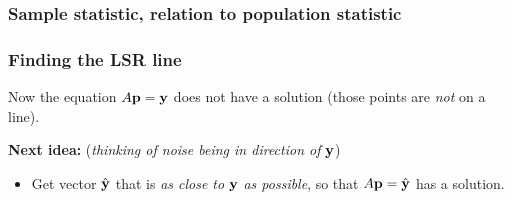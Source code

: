 \documentclass{beamer}
\theoremstyle{example}
\begin{document}
\begin{frame}[fragile]
\frametitle{Sample statistic, relation to population statistic}

\end{frame}
    
\begin{frame}
\frametitle{Finding the LSR line}
Now the equation $A{\bf p} = {\bf y}$ does not have a solution (those points are \emph{not} on a line). 

\textbf{Next idea:} (\emph{thinking of noise being in direction of} ${\bf y}$) 
\begin{itemize}
    \item Get vector $\hat{\bf y}$ that is \emph{as close to} ${\bf y}$ \emph{as possible}, so that $A{\bf p} = \hat{\bf y}$ has a solution.
\end{itemize}

\begin{multicols}{2}

\end{multicols}

\end{frame}
\end{document}
